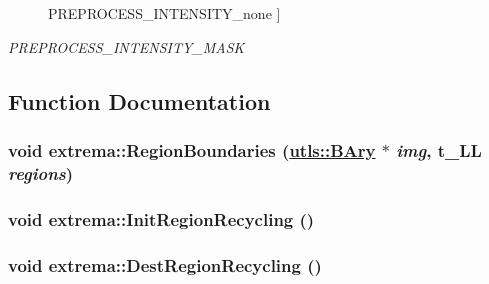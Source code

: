 \begin{Desc}
\begin{description}
{\hypertarget{namespaceextrema_837b46455687e9080322d02a03574dab87840119e4ff8124647a53f61ee7b40d}{
PREPROCESS\_\-INTENSITY\_\-none}
\label{namespaceextrema_837b46455687e9080322d02a03574dab87840119e4ff8124647a53f61ee7b40d}
}]\item[{\em 
\hypertarget{namespaceextrema_837b46455687e9080322d02a03574dab13d197e4e739d54780467b0c74d12c32}{
PREPROCESS\_\-INTENSITY\_\-MASK}
\label{namespaceextrema_837b46455687e9080322d02a03574dab13d197e4e739d54780467b0c74d12c32}
}]\end{description}
\end{Desc}



\subsection{Function Documentation}
\hypertarget{namespaceextrema_a95ae7aa3f47be9a16b8c0c503fd7e79}{
\subsubsection[RegionBoundaries]{\setlength{\rightskip}{0pt plus 5cm}void extrema::Region\-Boundaries (\hyperlink{structutls_1_1Ary}{utls::BAry} $\ast$ {\em img}, t\_\-LL {\em regions})}}
\label{namespaceextrema_a95ae7aa3f47be9a16b8c0c503fd7e79}


\hypertarget{namespaceextrema_8325736376fa1836b6819f542de6274a}{
\subsubsection[InitRegionRecycling]{\setlength{\rightskip}{0pt plus 5cm}void extrema::Init\-Region\-Recycling ()}}
\label{namespaceextrema_8325736376fa1836b6819f542de6274a}


\hypertarget{namespaceextrema_2ebf6ba956eabc1f5c60cddf60af40ef}{
\subsubsection[DestRegionRecycling]{\setlength{\rightskip}{0pt plus 5cm}void extrema::Dest\-Region\-Recycling ()}}
\label{namespaceextrema_2ebf6ba956eabc1f5c60cddf60af40ef}


